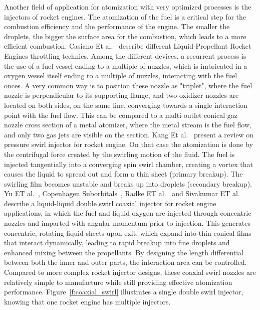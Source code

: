 \documentclass[../main]{subfiles}
\begin{document}
Another field of application for atomization with very optimized processes is the injectors of rocket engines. The atomization of the fuel is a critical step for the combustion efficiency and the performance of the engine. The smaller the droplets, the bigger the surface area for the combustion, which leads to a more efficient combustion. Casiano Et al.~\cite{Casiano2009LiquidPropellantRocket} describe different Liquid-Propellant Rocket Engines throttling technics. Among the different devices, a recurrent process is the use of a fuel vessel ending to a multiple of nuzzles, which is imbricated in a oxygen vessel itself ending to a multiple of nuzzles, interacting with the fuel onces. A very common way is to position these nozzle as "triplet", where the fuel nozzle is perpendicular to  its supporting flange, and two oxidizer nozzles are located on both sides, on the same line, converging towards a single interaction point with the fuel flow. This can be compared to a multi-outlet conical gaz nozzle cross section of a metal atomizer, where the metal stream is the fuel flow, and only two gas jets are visible on the section.
Kang Et al.~\cite{Kang2018ReviewPressure} present a review on pressure swirl injector for rocket engine. On that case the atomization is done by the centrifugal force created by the swirling motion of the fluid. The fuel is injected tangentially into a converging spin swirl chamber, creating a vortex that causes the liquid to spread out and form a thin sheet (primary breakup). The swirling film becomes unstable and breaks up into droplets (secondary breakup).
Yu ET al.~\cite{Yu2024DesignValidation}, Copenhagen Suborbitals~\cite{CopenhagenSuborbitals}, Radke ET al.~\cite{RadkeEffectInjector} and Sivakumar ET al.~\cite{Sivakumar1998HystereticInteraction} describe a liquid-liquid double swirl coaxial injector for rocket engine applications, in which the fuel and liquid oxygen are injected through concentric nozzles and imparted with angular momentum prior to injection. This generates concentric, rotating liquid sheets upon exit, which expand into thin conical films that interact dynamically, leading to rapid breakup into fine droplets and enhanced mixing between the propellants. By designing the length differential between both the inner and outer parts, the interaction area can be controlled. Compared to more complex rocket injector designs, these coaxial swirl nozzles are relatively simple to manufacture while still providing effective atomization performance. Figure~\ref{f:coaxial_swirl} illustrates a single double swirl injector, knowing that one rocket engine has multiple injectors.
\end{document}
